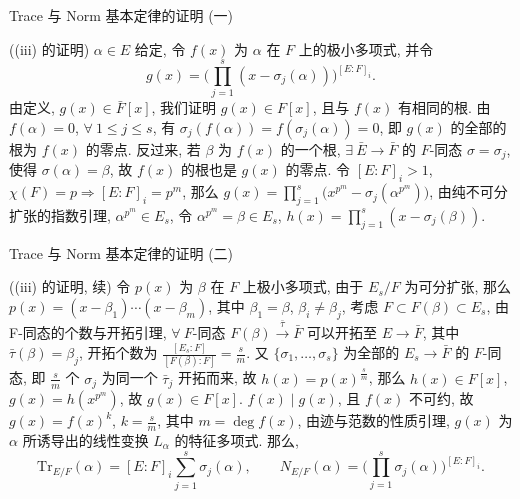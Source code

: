 
\begin{frame}{Trace 与 Norm 基本定律的证明 (一)}

\startproof[bg=yellow, fg=red]((iii) 的证明)
$\alpha \in E$ 给定, 令 $f(x)$ 为 $\alpha$ 在 $F$ 上的极小多项式, 并令
\[
g(x) = \Big( \prod_{j=1}^{s} (x - \sigma_j(\alpha)) \Big)^{[E:F]_i}.
\]
由定义, $g(x) \in \bar{F}[x]$, 我们证明 $g(x) \in F[x]$, 且与 $f(x)$
有相同的根.
由 $f(\alpha) = 0$, $\forall\ 1 \leq j \leq s$, 有
$\sigma_j(f(\alpha)) = f(\sigma_j(\alpha)) = 0$,
即 $g(x)$ 的全部的根为 $f(x)$ 的零点.
反过来, 若 $\beta$ 为 $f(x)$ 的一个根, $\exists\ \bar{E} \to \bar{F}$ 的
$F$-同态 $\sigma = \sigma_j$, 使得 $\sigma(\alpha) = \beta$,
故 $f(x)$ 的根也是 $g(x)$ 的零点.
令 $[E:F]_i > 1$, $\chi(F) = p \Longrightarrow [E:F]_i = p^m$,
那么 $g(x) = \prod_{j=1}^{s} \big( x^{p^m} - \sigma_j(\alpha^{p^m}) \big)$,
由纯不可分扩张的指数引理, $\alpha^{p^m} \in E_s$,
令 $\alpha^{p^m} = \beta \in E_s$,
$h(x) = \prod_{j=1}^{s} (x - \sigma_j(\beta))$.

\end{frame}


\begin{frame}{Trace 与 Norm 基本定律的证明 (二)}

\startproof[bg=yellow, fg=red]((iii) 的证明, 续)
令 $p(x)$ 为 $\beta$ 在 $F$ 上极小多项式, 由于 $E_s/F$ 为可分扩张,
那么 $p(x) = (x - \beta_1) \dotsm (x - \beta_m)$, 其中 $\beta_1 = \beta$,
$\beta_i \neq \beta_j$,
考虑 $F \subset F(\beta) \subset E_s$, 由 F-同态的个数与开拓引理,
$\forall\ F$-同态 $F(\beta) \xrightarrow{\ \bar{\tau}\ } \bar{F}$
可以开拓至 $E \to \bar{F}$, 其中 $\bar{\tau}(\beta) = \beta_j$,
开拓个数为 $\frac{[E_s:F]}{[F(\beta):F]} = \frac{s}{m}$.
又 $\{ \sigma_1, \dots, \sigma_s \}$ 为全部的 $E_s \to \bar{F}$ 的 $F$-同态,
即 $\frac{s}{m}$ 个 $\sigma_j$ 为同一个 $\bar{\tau}_j$ 开拓而来,
故 $h(x) = p(x)^{\frac{s}{m}}$,
那么 $h(x) \in F[x]$, $g(x) = h(x^{p^m})$, 故 $g(x) \in F[x]$.
$f(x) \mid g(x)$, 且 $f(x)$ 不可约, 故 $g(x) = f(x)^k$, $k = \frac{s}{m}$,
其中 $m = \deg f(x)$, 由迹与范数的性质引理, $g(x)$ 为 $\alpha$
所诱导出的线性变换 $L_\alpha$ 的特征多项式.
那么,
\[
\mathrm{Tr}_{E/F}(\alpha) = [E:F]_i \sum_{j=1}^{s} \sigma_j(\alpha),
\qquad
N_{E/F}(\alpha) = \Big( \prod_{j=1}^{s} \sigma_j(\alpha) \Big)^{[E:F]_i}.
\]

\end{frame}

